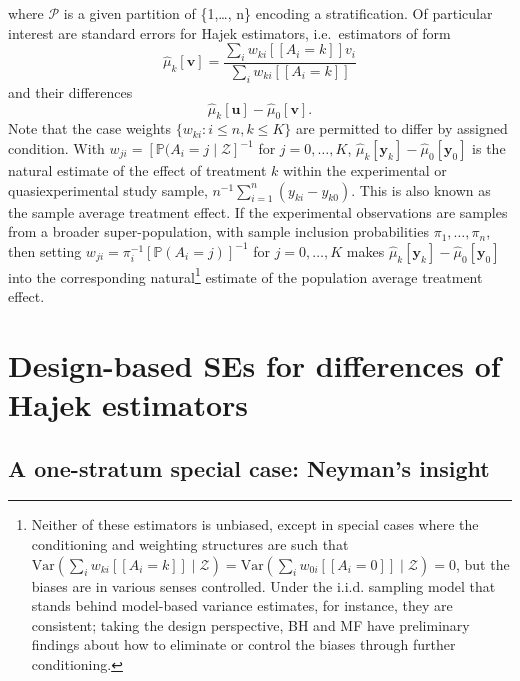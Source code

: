 where \(\mathcal{P}\) is a given partition of \{1,\ldots{}, n\} encoding
a stratification. Of particular interest are standard errors for Hajek
estimators, i.e.~estimators of form
\[\hat{\mu}_k[\mathbf{v}] = \frac{\sum_i w_{ki} [\![A_i=k]\!] v_i}{\sum_i w_{ki}  [\![A_i=k]\!]}\]
and their differences 
\begin{equation}\label{eq:hajekdiff}
\hat{\mu}_k[\mathbf{u}] - \hat{\mu}_0[\mathbf{v}].
\end{equation}
Note that the case weights $\{w_{ki}:i\leq n, k\leq K\}$ are permitted
to differ by assigned condition. 
With $w_{ji} =[\mathbb{P}(A_{i}=j \mid \mathcal{Z}]^{-1}$ for
$j=0, \ldots, K$,
$\hat{\mu}_k[\mathbf{y}_{k}] - \hat{\mu}_0[\mathbf{y}_{0}]$ is the
natural estimate of the effect of treatment $k$ within the
experimental or quasiexperimental study sample,
$n^{-1}\sum_{i=1}^{n}(y_{ki}-y_{k0})$.  This is also known as the
sample average treatment effect. If the experimental observations are
samples from a broader super-population, with sample inclusion
probabilities $\pi_{1}, \ldots, \pi_{n}$, then setting
$w_{ji} =\pi_{i}^{-1}[\mathbb{P}(A_{i}=j)]^{-1}$ for $j=0, \ldots, K$
makes $\hat{\mu}_k[\mathbf{y}_{k}] - \hat{\mu}_0[\mathbf{y}_{0}]$ into
the corresponding natural\footnote{Neither of these estimators is unbiased, except in special
cases where the conditioning and weighting structures are such that
$\mathrm{Var}(\sum_i w_{ki} [\![A_i=k]\!] \mid \mathcal{Z}) = \mathrm{Var}(\sum_i
w_{0i} [\![A_i=0]\!] \mid \mathcal{Z}) = 0$, but the biases are
in various senses controlled. Under the i.i.d. sampling model that
stands behind model-based variance estimates, for instance, they are
consistent; taking the design perspective, BH and MF have preliminary
findings about how to eliminate or control the biases through further
conditioning.} estimate of the population average treatment
effect.

\section*{Design-based SEs for differences of Hajek estimators}
\subsection*{A one-stratum special case: Neyman's insight}

